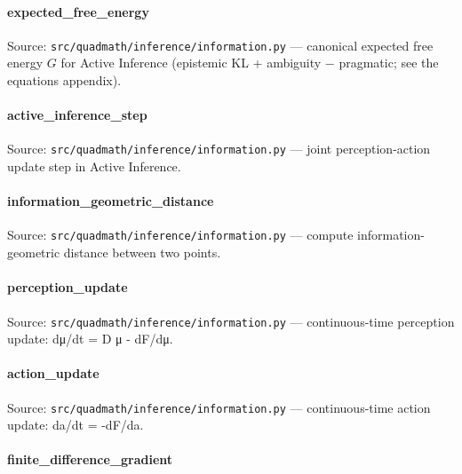 \documentclass[
  10pt,
]{article}
\newcommand{\passthrough}[1]{#1}
\renewcommand{\texttt}[1]{%
    \colorbox{codebg}{\color{codefg}\ttfamily #1}%
}
\begin{document}
\paragraph{\texorpdfstring{\texttt{expected\_free\_energy}}{expected\_free\_energy}}\label{code:expected_free_energy}

Source: \passthrough{\lstinline!src/quadmath/inference/information.py!}
--- canonical expected free energy \(G\) for Active Inference (epistemic
KL + ambiguity − pragmatic; see the equations appendix).

\paragraph{\texorpdfstring{\texttt{active\_inference\_step}}{active\_inference\_step}}\label{code:active_inference_step}

Source: \passthrough{\lstinline!src/quadmath/inference/information.py!}
--- joint perception-action update step in Active Inference.

\paragraph{\texorpdfstring{\texttt{information\_geometric\_distance}}{information\_geometric\_distance}}\label{code:information_geometric_distance}

Source: \passthrough{\lstinline!src/quadmath/inference/information.py!}
--- compute information-geometric distance between two points.

\paragraph{\texorpdfstring{\texttt{perception\_update}}{perception\_update}}\label{code:perception_update}

Source: \passthrough{\lstinline!src/quadmath/inference/information.py!}
--- continuous-time perception update: dμ/dt = D μ - dF/dμ.

\paragraph{\texorpdfstring{\texttt{action\_update}}{action\_update}}\label{code:action_update}

Source: \passthrough{\lstinline!src/quadmath/inference/information.py!}
--- continuous-time action update: da/dt = -dF/da.

\paragraph{\texorpdfstring{\texttt{finite\_difference\_gradient}}{finite\_difference\_gradient}}\label{code:finite_difference_gradient}
\end{document}
